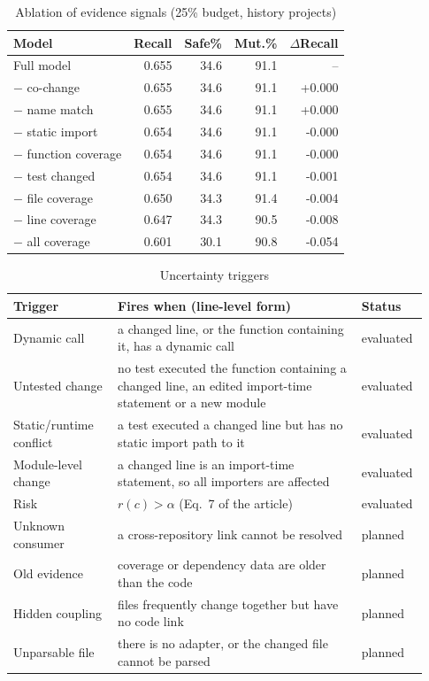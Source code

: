 \documentclass[11pt]{article}
\begin{document}
\begin{table}[htbp]
\caption{Ablation of evidence signals (25\% budget, history projects)}
\label{tab:ablation}
\centering
\footnotesize
\begin{tabular}{@{}lrrrr@{}}
\toprule
\textbf{Model} & \textbf{Recall} & \textbf{Safe\%} & \textbf{Mut.\%} & \textbf{$\Delta$Recall} \\
\midrule
Full model & 0.655 & 34.6 & 91.1 & -- \\
$-$ co-change & 0.655 & 34.6 & 91.1 & +0.000 \\
$-$ name match & 0.655 & 34.6 & 91.1 & +0.000 \\
$-$ static import & 0.654 & 34.6 & 91.1 & -0.000 \\
$-$ function coverage & 0.654 & 34.6 & 91.1 & -0.000 \\
$-$ test changed & 0.654 & 34.6 & 91.1 & -0.001 \\
$-$ file coverage & 0.650 & 34.3 & 91.4 & -0.004 \\
$-$ line coverage & 0.647 & 34.3 & 90.5 & -0.008 \\
$-$ all coverage & 0.601 & 30.1 & 90.8 & -0.054 \\
\bottomrule
\end{tabular}
\end{table}

\begin{table}[htbp]
\caption{Uncertainty triggers}
\label{tab:triggers}
\centering
\footnotesize
\setlength{\tabcolsep}{3pt}
\begin{tabular}{@{}>{\raggedright\arraybackslash}p{0.24\linewidth}>{\raggedright\arraybackslash}p{0.56\linewidth}>{\raggedright\arraybackslash}p{0.13\linewidth}@{}}
\toprule
\textbf{Trigger} & \textbf{Fires when (line-level form)} & \textbf{Status} \\
\midrule
Dynamic call & a changed line, or the function containing it, has a dynamic call & evaluated \\
Untested change & no test executed the function containing a changed line, an edited import-time statement or a new module & evaluated \\
Static/runtime conflict & a test executed a changed line but has no static import path to it & evaluated \\
Module-level change & a changed line is an import-time statement, so all importers are affected & evaluated \\
\midrule
Risk & $r(c) > \alpha$ (Eq.~7 of the article) & evaluated \\
\midrule
Unknown consumer & a cross-repository link cannot be resolved & planned \\
Old evidence & coverage or dependency data are older than the code & planned \\
Hidden coupling & files frequently change together but have no code link & planned \\
Unparsable file & there is no adapter, or the changed file cannot be parsed & planned \\
\bottomrule
\end{tabular}
\end{table}
\end{document}
